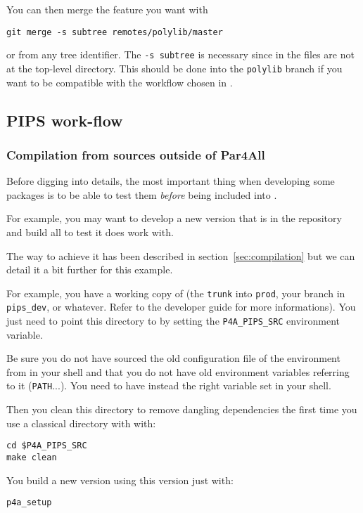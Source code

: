 \documentclass[a4paper]{article}
\begin{document}
You can then merge the feature you want with
\begin{verbatim}
git merge -s subtree remotes/polylib/master
\end{verbatim}
or from any tree identifier. The \texttt{-s subtree} is necessary since in
\Apfa the \Apolylib files are not at the top-level directory. This should
be done into the \texttt{polylib} branch if you want to be compatible with
the workflow chosen in \Apfa.


\subsection{PIPS work-flow}
\label{sec:pips-workflow}

\subsubsection{Compilation from sources outside of Par4All }
\label{sec:comp-from-sourc}

Before digging into details, the most important thing when developing some
\Apfa packages is to be able to test them \emph{before} being included
into \Apfa.

For example, you may want to develop a new \Apips version that is in the
\Acri{} \Asvn repository and build all \Apfa to test it does work with.

The way to achieve it has been described in section~\ref{sec:compilation}
but we can detail it a bit further for this example.

For example, you have a \Asvn working copy of \Apips (the \texttt{trunk}
into \texttt{prod}, your branch in \verb|pips_dev|, or whatever. Refer
to the \Apips developer guide for more informations). You just need to
point this directory to \Apfa by setting the \verb|P4A_PIPS_SRC|
environment variable.

Be sure you do not have sourced the old configuration file of the \Apips
\Asvn environment from \Acri in your shell and that you do not have old
environment variables referring to it (\verb|PATH|...). You need to have
instead the right \Apfa variable set in your shell.

Then you clean this directory to remove dangling dependencies the first
time you use a classical \Apips directory with \Apfa with:
\begin{verbatim}
cd $P4A_PIPS_SRC
make clean
\end{verbatim}

You build a new \Apfa version using this \Apips version just with:
\begin{verbatim}
p4a_setup
\end{verbatim}
\end{document}
